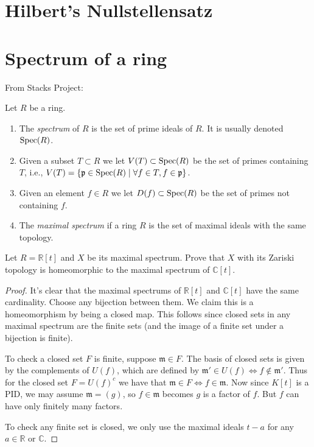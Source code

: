 \section{Hilbert's Nullstellensatz}
\label{section-nullstellensatz}

\section{Spectrum of a ring}
\label{section-spectrum}

\noindent
From Stacks Project:

\begin{definition}
\label{definition-spectrum-ring}
Let $R$ be a ring.
\begin{enumerate}

\item The {\it spectrum} of $R$ is the set of
prime ideals of $R$.
It is usually denoted $\mathop{\mathrm{Spec}}(R)$.

\item Given a subset $T \subset R$ we let
$V(T) \subset \mathop{\mathrm{Spec}}(R)$ be the set of primes
containing $T$, i.e., $V(T) = \{ \mathfrak p
\in \mathop{\mathrm{Spec}}(R) \mid \forall f\in T, f\in
\mathfrak p\}$.

\item Given an element $f \in R$ we let $D(f)
\subset \mathop{\mathrm{Spec}}(R)$ be the set of primes not
containing $f$.

\item The {\it maximal spectrum} if a ring $R$
is the set of maximal ideals with the same
topology.
\end{enumerate}
\end{definition}

\begin{exercise}
\label{exercise-maximal-spectrum}
Let $R=\mathbb{R}[t]$ and $X$ be its
maximal spectrum. Prove that $X$ with its
Zariski topology is homeomorphic
to the maximal spectrum of $\mathbb{C}[t]$.
\end{exercise}

\begin{proof}
It's clear that
the maximal spectrums of $\mathbb{R}[t]$
and $\mathbb{C}[t]$ have the same
cardinality. Choose any bijection between
them. We claim this is a homeomorphism
by being a closed map. This follows
since closed sets in any maximal spectrum
are the finite sets (and the
image of a finite set under
a bijection is finite).

To check a closed set $F$ is finite,
suppose $\mathfrak{m} \in F$.
The basis of closed sets is given
by the complements of $U(f)$,
which are defined by
$\mathfrak{m}' \in U(f) \iff
f \not\in \mathfrak{m}'$.
Thus for the closed set $F=U(f)^c$
we have that $\mathfrak{m} \in F
\iff f \in \mathfrak{m}$.
Now since $K[t]$ is a PID,
we may assume $\mathfrak{m}=(g)$,
so $f \in \mathfrak{m}$ becomes
$g$ is a factor of $f$.
But $f$ can have only finitely many factors.

To check any finite set is closed, we
only use the maximal ideals
$t-a$ for any $a \in \mathbb{R}$ or
$\mathbb{C}$.
\end{proof}

